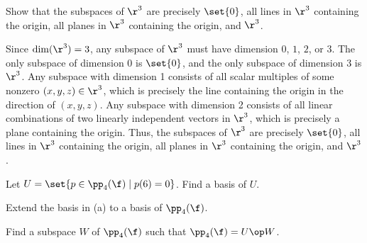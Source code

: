 \begin{exercise}[2c2]
    Show that the subspaces of $\r^3$ are precisely $\set{0}$, all lines in $\r^3$ containing the origin, all planes in $\r^3$ containing the origin, and $\r^3$.
\end{exercise}

\begin{sol}
    Since $\dim(\r^3) = 3$, any subspace of $\r^3$ must have dimension $0$, $1$, $2$, or $3$. The only subspace of dimension $0$ is $\set{0}$, and the only subspace of dimension $3$ is $\r^3$. Any subspace with dimension 1 consists of all scalar multiples of some nonzero $(x, y, z) \in \r^3$, which is precisely the line containing the origin in the direction of $(x, y, z)$. Any subspace with dimension 2 consists of all linear combinations of two linearly independent vectors in $\r^3$, which is precisely a plane containing the origin. Thus, the subspaces of $\r^3$ are precisely $\set{0}$, all lines in $\r^3$ containing the origin, all planes in $\r^3$ containing the origin, and $\r^3$.
\end{sol}

\begin{exercise}[2c3]
    \begin{subexercises}
        \item Let $U = \set{p \in \pp_4(\f) \mid p(6) = 0}$. Find a basis of $U$.
        \item Extend the basis in (a) to a basis of $\pp_4(\f)$.
        \item Find a subspace $W$ of $\pp_4(\f)$ such that $\pp_4(\f) = U \op W$.
    \end{subexercises}
\end{exercise}

